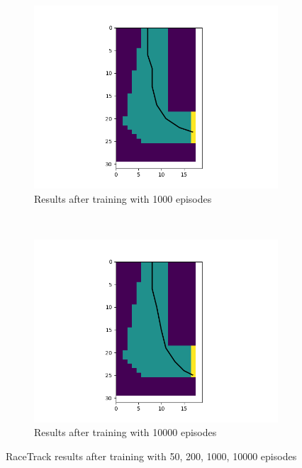 \documentclass[10pt,letterpaper]{article}
\begin{document}
\begin{figure}
    \begin{subfigure}[b]{0.5\textwidth}
        \centering
        \includegraphics[scale=0.4]{RaceTrace_1000}
        \caption{Results after training with 1000 episodes}
    \end{subfigure}%
~
    \begin{subfigure}[b]{0.5\textwidth}
        \centering
        \includegraphics[scale=0.4]{RaceTrace_10000}
        \caption{Results after training with 10000 episodes}
    \end{subfigure}
    \caption{RaceTrack results after training with 50, 200, 1000, 10000 episodes}
  \label{fig:race_results}
\end{figure}
\end{document}
